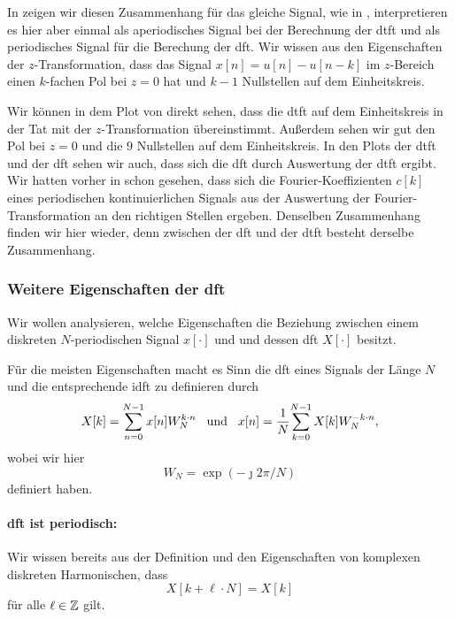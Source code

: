 In  zeigen wir diesen Zusammenhang für das gleiche Signal, wie in , interpretieren es hier aber einmal als aperiodisches Signal bei der Berechnung der \gls{dtft} und als periodisches Signal für die Berechung der \gls{dft}.
Wir wissen aus den Eigenschaften der $z$-Transformation, dass das Signal $x[n] = u[n] - u[n-k]$ im $z$-Bereich einen $k$-fachen Pol bei $z = 0$ hat und $k-1$ Nullstellen auf dem Einheitskreis.

Wir können in dem Plot von  direkt sehen, dass die \gls{dtft} auf dem Einheitskreis in der Tat mit der $z$-Transformation übereinstimmt.
Außerdem sehen wir gut den Pol bei $z=0$ und die $9$ Nullstellen auf dem Einheitskreis.
In den Plots der \gls{dtft} und der \gls{dft} sehen wir auch, dass sich die \gls{dft} durch Auswertung der \gls{dtft} ergibt.
Wir hatten vorher in  schon gesehen, dass sich die Fourier-Koeffizienten $c[k]$ eines periodischen kontinuierlichen Signals aus der Auswertung der Fourier-Transformation an den richtigen Stellen ergeben.
Denselben Zusammenhang finden wir hier wieder, denn zwischen der \gls{dft} und der \gls{dtft} besteht derselbe Zusammenhang.
%
\FloatBarrier
\subsubsection{Weitere Eigenschaften der \texorpdfstring{\acrshort*{dft}}{DFT}}
%
Wir wollen analysieren, welche Eigenschaften die Beziehung zwischen einem diskreten $N$-periodischen Signal $x[\cdot]$ und und dessen \gls{dft} $X[\cdot]$ besitzt.

Für die meisten Eigenschaften macht es Sinn die \gls{dft} eines Signals der Länge $N$ und die entsprechende \gls{idft} zu definieren durch
\begin{equation}\label{eq:fourier:dft_idft}
    X[k] = {\sum\limits_{n=0}^{N-1}{x[n] W_N^{k \cdot n}}}
    {\hspace{3mm} \text{und} \hspace{3mm}}
    x[n] = \frac{1}{N}{\sum\limits_{k=0}^{N-1}{X[k] W_N^{-k \cdot n}}},
\end{equation}
wobei wir hier 
\begin{equation}\label{eq:fourier:weights}
    W_N = \exp(-\jmath 2 \pi / N)
\end{equation} 
definiert haben.
%
%
\paragraph{\gls{dft} ist periodisch:} Wir wissen bereits aus der Definition und den Eigenschaften von komplexen diskreten Harmonischen, dass
\[
X[k + \ell \cdot N] = X[k]
\]
für alle $\ell \in \mathbb{Z}$ gilt.
%
%
